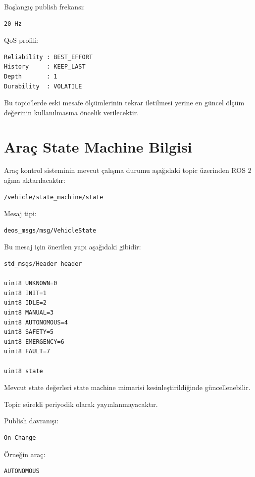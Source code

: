 \documentclass[12pt,a4paper]{article}
\begin{document}
Başlangıç publish frekansı:

\begin{verbatim}
20 Hz
\end{verbatim}

QoS profili:

\begin{verbatim}
Reliability : BEST_EFFORT
History     : KEEP_LAST
Depth       : 1
Durability  : VOLATILE
\end{verbatim}

Bu topic'lerde eski mesafe ölçümlerinin tekrar iletilmesi yerine
en güncel ölçüm değerinin kullanılmasına öncelik verilecektir.

\section{Araç State Machine Bilgisi}

Araç kontrol sisteminin mevcut çalışma durumu aşağıdaki topic üzerinden
ROS 2 ağına aktarılacaktır:

\begin{verbatim}
/vehicle/state_machine/state
\end{verbatim}

Mesaj tipi:

\begin{verbatim}
deos_msgs/msg/VehicleState
\end{verbatim}

Bu mesaj için önerilen yapı aşağıdaki gibidir:

\begin{verbatim}
std_msgs/Header header

uint8 UNKNOWN=0
uint8 INIT=1
uint8 IDLE=2
uint8 MANUAL=3
uint8 AUTONOMOUS=4
uint8 SAFETY=5
uint8 EMERGENCY=6
uint8 FAULT=7

uint8 state
\end{verbatim}

Mevcut state değerleri state machine mimarisi kesinleştirildiğinde
güncellenebilir.

Topic sürekli periyodik olarak yayınlanmayacaktır.

Publish davranışı:

\begin{verbatim}
On Change
\end{verbatim}

Örneğin araç:

\begin{verbatim}
AUTONOMOUS
\end{verbatim}
\end{document}
